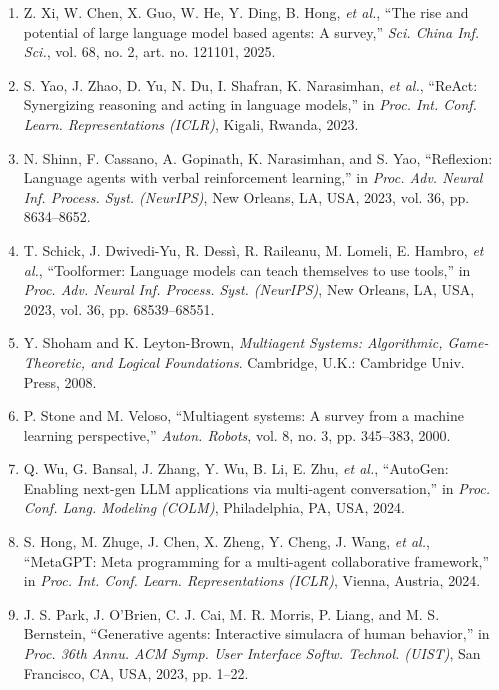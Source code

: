 \begin{enumerate}
\item\label{ref:xi2025}
  Z. Xi, W. Chen, X. Guo, W. He, Y. Ding, B. Hong, \emph{et al.}, ``The rise
  and potential of large language model based agents: A survey,''
  \emph{Sci. China Inf. Sci.}, vol. 68, no. 2, art. no. 121101, 2025.

\item\label{ref:yao2023}
  S. Yao, J. Zhao, D. Yu, N. Du, I. Shafran, K. Narasimhan,
  \emph{et al.}, ``ReAct: Synergizing reasoning and acting in language
  models,'' in \emph{Proc. Int. Conf. Learn. Representations (ICLR)},
  Kigali, Rwanda, 2023.

\item\label{ref:shinn2023}
  N. Shinn, F. Cassano, A. Gopinath, K. Narasimhan, and S. Yao,
  ``Reflexion: Language agents with verbal reinforcement learning,'' in
  \emph{Proc. Adv. Neural Inf. Process. Syst. (NeurIPS)}, New Orleans, LA,
  USA, 2023, vol. 36, pp. 8634--8652.

\item\label{ref:schick2023}
  T. Schick, J. Dwivedi-Yu, R. Dessì, R. Raileanu, M. Lomeli, E. Hambro,
  \emph{et al.}, ``Toolformer: Language models can teach themselves to use
  tools,'' in \emph{Proc. Adv. Neural Inf. Process. Syst. (NeurIPS)},
  New Orleans, LA, USA, 2023, vol. 36, pp. 68539--68551.

\item\label{ref:shoham2008}
  Y. Shoham and K. Leyton-Brown, \emph{Multiagent Systems: Algorithmic,
  Game-Theoretic, and Logical Foundations}. Cambridge, U.K.: Cambridge Univ.
  Press, 2008.

\item\label{ref:stone2000}
  P. Stone and M. Veloso, ``Multiagent systems: A survey from a machine
  learning perspective,'' \emph{Auton. Robots}, vol. 8, no. 3,
  pp. 345--383, 2000.

\item\label{ref:wu2024}
  Q. Wu, G. Bansal, J. Zhang, Y. Wu, B. Li, E. Zhu, \emph{et al.},
  ``AutoGen: Enabling next-gen LLM applications via multi-agent
  conversation,'' in \emph{Proc. Conf. Lang. Modeling (COLM)}, Philadelphia,
  PA, USA, 2024.

\item\label{ref:hong2024}
  S. Hong, M. Zhuge, J. Chen, X. Zheng, Y. Cheng, J. Wang, \emph{et al.},
  ``MetaGPT: Meta programming for a multi-agent collaborative framework,''
  in \emph{Proc. Int. Conf. Learn. Representations (ICLR)}, Vienna, Austria,
  2024.

\item\label{ref:park2023}
  J. S. Park, J. O'Brien, C. J. Cai, M. R. Morris, P. Liang, and
  M. S. Bernstein, ``Generative agents: Interactive simulacra of human
  behavior,'' in \emph{Proc. 36th Annu. ACM Symp. User Interface Softw.
  Technol. (UIST)}, San Francisco, CA, USA, 2023, pp. 1--22.

\end{enumerate}
